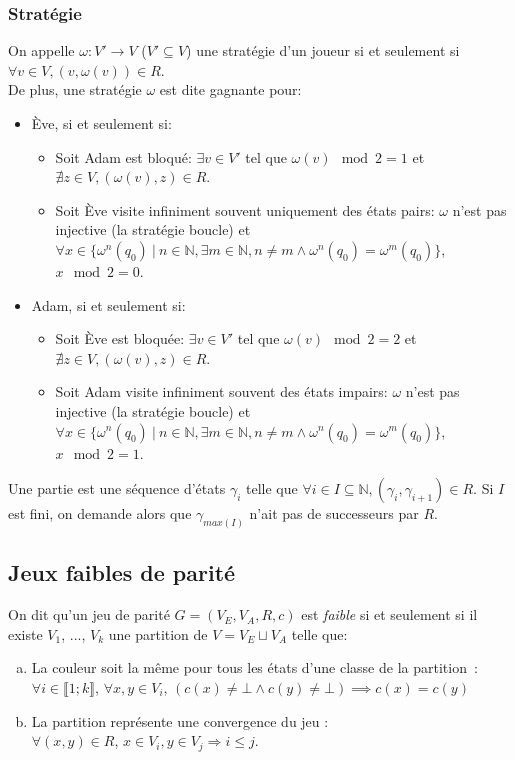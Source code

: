\documentclass[10pt,a4paper]{article}
\begin{document}
\subsubsection{Stratégie}
On appelle $\omega : V' \to V$ ($V' \subseteq V$) une stratégie d'un joueur si et seulement si $\forall v \in V, (v,\omega(v)) \in R$.\\
De plus, une stratégie $\omega$ est dite gagnante pour:
\begin{itemize}
	\item Ève, si et seulement si:
	\begin{itemize}
		\item Soit Adam est bloqué: $\exists v \in V'$ tel que $\omega(v) \mod 2 = 1$ et $\nexists z \in V, (\omega(v), z) \in R$.
		\item Soit Ève visite infiniment souvent uniquement des états pairs: $\omega$ n'est pas injective (la stratégie boucle) et $\forall x \in \{\omega^n(q_0)\ |\ n\in \mathbb{N}, \exists m \in \mathbb{N}, n \neq  m \land \omega^n(q_0) = \omega^m(q_0)\}$, $x \mod 2 = 0$.
	\end{itemize}
	\item Adam, si et seulement si:
	\begin{itemize}
		\item Soit Ève est bloquée: $\exists v \in V'$ tel que $\omega(v) \mod 2 = 2$ et $\nexists z \in V, (\omega(v), z) \in R$.
		\item Soit Adam visite infiniment souvent des états impairs: $\omega$ n'est pas injective (la stratégie boucle) et $\forall x \in \{\omega^n(q_0)\ |\ n\in \mathbb{N}, \exists m \in \mathbb{N}, n \neq  m \land \omega^n(q_0) = \omega^m(q_0)\}$, $x \mod 2 = 1$.
\end{itemize}
\end{itemize}

Une partie est une séquence d'états $\gamma_i$ telle que $\forall i \in I \subseteq \mathbb{N}, (\gamma_i,\gamma_{i+1}) \in R$. Si $I$ est fini, on demande alors que $\gamma_{max(I)}$ n'ait pas de successeurs par $R$.

\subsection{Jeux faibles de parité}
\label{fpg}

On dit qu'un jeu de parité $G = (V_E,V_A,R,c)$ est \emph{faible}  si et seulement si il existe $V_1$, ..., $V_k$ une partition de $V = V_E \sqcup V_A$ telle que:
\begin{enumerate}[a)]
\item La couleur soit la même pour tous les états d'une classe de la partition : $\forall i \in \llbracket 1 ; k \rrbracket$, $\forall x, y \in V_i$, $(c(x) \neq \bot \land c(y) \neq \bot)  \implies c(x) = c(y)$
\item La partition représente une convergence du jeu :\\
$\forall (x, y) \in R$, $x\in V_i, y \in V_j \Rightarrow i \leq j$.
\end{enumerate}
\end{document}
